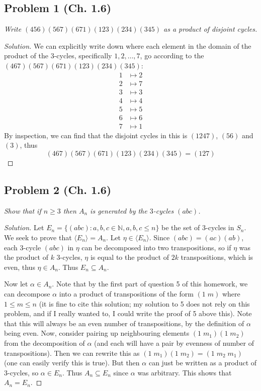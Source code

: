 \documentclass{article}
\newcommand{\N}{{\mathbb N}}
\begin{document}
\subsection*{Problem 1 (Ch. 1.6)}
{\it Write $(456)(567)(671)(123)(234)(345)$ as a product of disjoint cycles.}
\begin{proof}[Solution]\let\qed\relax
	We can explicitly write down where each element
	in the domain of the product of the $3$-cycles,
	specifically $1,2,\dots,7$,
	go according to the $(467)(567)(671)(123)(234)(345)$:
	\begin{align*}
		1 &\mapsto 2\\
		2 &\mapsto 7\\
		3 &\mapsto 3\\
		4 &\mapsto 4\\
		5 &\mapsto 5\\
		6 &\mapsto 6\\
		7 &\mapsto 1
	\end{align*}
	By inspection, we can find that the disjoint cycles in this is
	$(1247)$, $(56)$ and $(3)$, thus
	\[
		(467)(567)(671)(123)(234)(345) = (127)
	\]
\end{proof}

\subsection*{Problem 2 (Ch. 1.6)}
{\it Show that if $n \geq 3$ then $A_n$ is generated by the $3$-cycles $(abc)$.}
\begin{proof}[Solution]\let\qed\relax
	Let $E_n = \{(abc) \colon a,b,c\in \N, a,b,c \leq n\}$ be the set of $3$-cycles in $S_n$.
	We seek to prove that $\langle E_n\rangle = A_n$.
	Let $\eta \in \langle E_n\rangle$.
	Since $(abc) = (ac)(ab)$,
	each $3$-cycle $(abc)$ in $\eta$ can be decomposed into two transpositions,
	so if $\eta$ was the product of $k$ $3$-cycles,
	$\eta$ is equal to the product of $2k$ transpositions,
	which is even, thus $\eta \in A_n$.
	Thus $E_n \subseteq A_n$.
	
	Now let $\alpha \in A_n$.
	Note that by the first part of question 5 of this homework,
	we can decompose $\alpha$ into a product of transpositions of the form $(1\;m)$
	where $1 \leq m \leq n$
	(it is fine to cite this solution;
	my solution to 5 does not rely on this problem,
	and if I really wanted to,
	I could write the proof of 5 above this).
	Note that this will always be an even number of transpositions,
	by the definition of $\alpha$ being even.
	Now, consider pairing up neighbouring elements $(1 \; m_1)(1 \; m_2)$
	from the decomposition of $\alpha$
	(and each will have a pair by evenness of number of transpositions).
	Then we can rewrite this as $(1 \; m_1)(1 \; m_2) = (1\; m_2 \; m_1)$ (one can easily verify this is true).
	But then $\alpha$ can just be written as a product of $3$-cycles,
	so $\alpha \in E_n$.
	Thus $A_n \subseteq E_n$ since $\alpha$ was arbitrary.
	This shows that $A_n = E_n$.
\end{proof}
\end{document}
